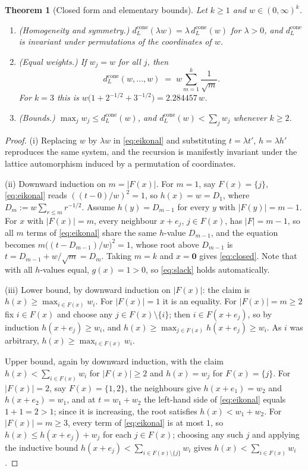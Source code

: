 \documentclass[11pt,reqno]{amsart}
\theoremstyle{plain}
\newtheorem{theorem}{Theorem}[section]
\theoremstyle{definition}
\theoremstyle{remark}
\numberwithin{equation}{section}
\newcommand{\dcone}{d_L^{\mathrm{cone}}}
\begin{document}
\begin{theorem}[Closed form and elementary bounds]
\label{thm:cone}
Let $k\ge1$ and $w\in(0,\infty)^k$.
\begin{enumerate}[label=\textup{(\roman*)},leftmargin=2.2em,itemsep=3pt]
\item \textup{(Homogeneity and symmetry.)} $\dcone(\lambda w)=\lambda\,\dcone(w)$ for $\lambda>0$, and $\dcone$ is invariant under permutations of the coordinates of $w$.
\item \textup{(Equal weights.)} If $w_j=w$ for all $j$, then
\begin{equation}
\label{eq:closed}
\dcone(w,\dots,w)\;=\;w\sum_{m=1}^{k}\frac{1}{\sqrt m}.
\end{equation}
For $k=3$ this is $w\bigl(1+2^{-1/2}+3^{-1/2}\bigr)=2.284457\,w$.
\item \textup{(Bounds.)} $\max_j w_j\le\dcone(w)$, and $\dcone(w)<\sum_j w_j$ whenever $k\ge2$.
\end{enumerate}
\end{theorem}

\begin{proof}
(i) Replacing $w$ by $\lambda w$ in \eqref{eq:eikonal} and substituting $t=\lambda t'$, $h=\lambda h'$ reproduces the same system, and the recursion is manifestly invariant under the lattice automorphism induced by a permutation of coordinates.

(ii) Downward induction on $m=|F(x)|$. For $m=1$, say $F(x)=\{j\}$, \eqref{eq:eikonal} reads $((t-0)/w)^2=1$, so $h(x)=w=D_1$, where $D_m:=w\sum_{r\le m}r^{-1/2}$. Assume $h(y)=D_{m-1}$ for every $y$ with $|F(y)|=m-1$. For $x$ with $|F(x)|=m$, every neighbour $x+e_j$, $j\in F(x)$, has $|F|=m-1$, so all $m$ terms of \eqref{eq:eikonal} share the same $h$-value $D_{m-1}$, and the equation becomes $m\bigl((t-D_{m-1})/w\bigr)^2=1$, whose root above $D_{m-1}$ is $t=D_{m-1}+w/\sqrt m=D_m$. Taking $m=k$ and $x=\mathbf{0}$ gives \eqref{eq:closed}. Note that with all $h$-values equal, $g(x)=1>0$, so \eqref{eq:slack} holds automatically.

(iii) Lower bound, by downward induction on $|F(x)|$: the claim is $h(x)\ge\max_{i\in F(x)}w_i$. For $|F(x)|=1$ it is an equality. For $|F(x)|=m\ge2$ fix $i\in F(x)$ and choose any $j\in F(x)\setminus\{i\}$; then $i\in F(x+e_j)$, so by induction $h(x+e_j)\ge w_i$, and $h(x)\ge\max_{j\in F(x)}h(x+e_j)\ge w_i$. As $i$ was arbitrary, $h(x)\ge\max_{i\in F(x)}w_i$.

Upper bound, again by downward induction, with the claim $h(x)<\sum_{i\in F(x)}w_i$ for $|F(x)|\ge2$ and $h(x)=w_j$ for $F(x)=\{j\}$. For $|F(x)|=2$, say $F(x)=\{1,2\}$, the neighbours give $h(x+e_1)=w_2$ and $h(x+e_2)=w_1$, and at $t=w_1+w_2$ the left-hand side of \eqref{eq:eikonal} equals $1+1=2>1$; since it is increasing, the root satisfies $h(x)<w_1+w_2$. For $|F(x)|=m\ge3$, every term of \eqref{eq:eikonal} is at most $1$, so $h(x)\le h(x+e_j)+w_j$ for each $j\in F(x)$; choosing any such $j$ and applying the inductive bound $h(x+e_j)<\sum_{i\in F(x)\setminus\{j\}}w_i$ gives $h(x)<\sum_{i\in F(x)}w_i$.
\end{proof}
\end{document}
